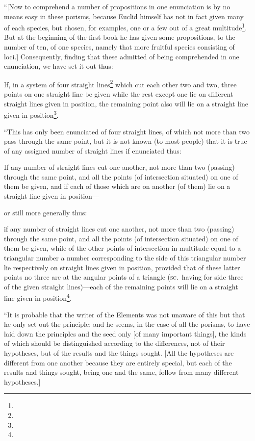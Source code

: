 ``[Now to comprehend a number of propositions in one enunciation is by no means easy in these porisms, because Euclid himself has not in fact given many of each species, but chosen, for examples, one or a few out of a great multitude\footnote{}. But at the beginning of the first book he has given some propositions, to the number of ten, of one species, namely that more fruitful species consisting of loci.] Consequently, finding that these admitted of being comprehended in one enunciation, we have set it out thus:

\begin{proposition}
	If, in a system of four straight lines\footnote{} which cut each other two and two, three points on one straight line be given while the rest except one lie on different straight lines given in position, the remaining point also will lie on a straight line given in position\footnote{}.
\end{proposition}

``This has only been enunciated of four straight lines, of which not more than two pass through the same point, but it is not known (to most people) that it is true of any assigned number of straight lines if enunciated thus:

\begin{proposition}
	If any number of straight lines cut one another, not more than two (passing) through the same point, and all the points (of intersection situated) on one of them be given, and if each of those which are on another (of them) lie on a straight line given in position---
\end{proposition}

\noindent
or still more generally thus:

\begin{proposition}
	\noindent
	if any number of straight lines cut one another, not more than two (passing) through the same point, and all the points (of intersection situated) on one of them be given, while of the other points of intersection in multitude equal to a triangular number a number corresponding to the side of this triangular number lie respectively on straight lines given in position, provided that of these latter points no three are at the angular points of a triangle (\textsc{sc.}~having for side three of the given straight lines)---each of the remaining points will lie on a straight line given in position\footnote{}.
\end{proposition}

``It is probable that the writer of the Elements was not unaware of this but that he only set out the principle; and he seems, in the case of all the porisms, to have laid down the principles and the seed only [of many important things], the kinds of which should be distinguished according to the differences, not of their hypotheses, but of the results and the things sought. [All the hypotheses are different from one another because they are entirely special, but each of the results and things sought, being one and the same, follow from many different hypotheses.]

